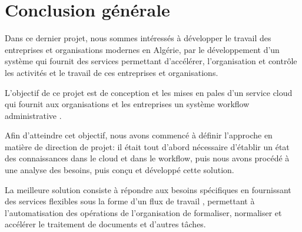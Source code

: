 \chapter*{Conclusion générale }
\large
Dans ce dernier projet, nous sommes intéressés à développer le travail des entreprises et organisations modernes en Algérie, par le développement d'un système qui fournit des services permettant d’accélérer, l’organisation et contrôle les activités et le travail de ces entreprises et organisations.

L’objectif de ce projet est de conception et les mises en pales d'un service cloud qui fournit aux organisations et les entreprises un système workflow administrative . 

Afin d’atteindre cet objectif, nous avons commencé à définir l’approche en matière de direction de projet: il était tout d’abord nécessaire d’établir un état des connaissances dans le cloud et dans le workflow, puis nous avons procédé à une analyse des besoins, puis conçu et développé cette solution.



La meilleure solution consiste à répondre aux besoins spécifiques en fournissant des services flexibles sous la forme d'un flux de travail , permettant à l'automatisation des opérations de l'organisation de formaliser, normaliser et accélérer le traitement de documents et d'autres tâches.
\normalsize